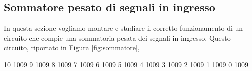 \subsection*{Sommatore pesato di segnali in ingresso}

In questa sezione vogliamo montare e studiare il corretto funzionamento di un circuito che compie una sommatoria pesata dei segnali in ingresso. Questo circuito, riportato in Figura \ref{fig:sommatore}, 



10	1009
9	1009
8	1009
7	1009
6	1009
5	1009
4	1009
3	1009
2	1009
1	1009
0	1009








